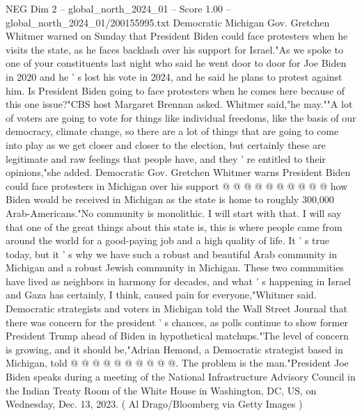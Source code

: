 \begin{textsample}{NEG Dim 2 – global\_north\_2024\_01 – Score 1.00 – global\_north\_2024\_01/200155995.txt}  \label{ex:f2_neg_246}
Democratic Michigan Gov.
Gretchen Whitmer warned on Sunday that President Biden could face protesters when he visits the state, as he faces backlash over his support for Israel."As we spoke to one of your constituents last night who said he went door to door for Joe Biden in 2020 and he ' s lost his vote in 2024, and he said he plans to protest against him.
Is President Biden going to face protesters when he comes here because of this one issue?"CBS host Margaret Brennan asked.
Whitmer said,"he may.""A lot of voters are going to vote for things like individual freedoms, like the basis of our democracy, climate change, so there are a lot of things that are going to come into play as we get closer and closer to the election, but certainly these are legitimate and raw feelings that people have, and they ' re entitled to their opinions,"she added.
Democratic Gov.
Gretchen Whitmer warns President Biden could face protesters in Michigan over his support @ @ @ @ @ @ @ @ @ @ how Biden would be received in Michigan as the state is home to roughly 300,000 Arab-Americans."No community is monolithic.
I will start with that.
I will say that one of the great things about this state is, this is where people came from around the world for a good-paying job and a high quality of life.
It ' s true today, but it ' s why we have such a robust and beautiful Arab community in Michigan and a robust Jewish community in Michigan.
These two communities have lived as neighbors in harmony for decades, and what ' s happening in Israel and Gaza has certainly, I think, caused pain for everyone,"Whitmer said.
Democratic strategists and voters in Michigan told the Wall Street Journal that there was concern for the president ' s chances, as polls continue to show former President Trump ahead of Biden in hypothetical matchups."The level of concern is growing, and it should be,"Adrian Hemond, a Democratic strategist based in Michigan, told @ @ @ @ @ @ @ @ @ @.
The problem is the man."President Joe Biden speaks during a meeting of the National Infrastructure Advisory Council in the Indian Treaty Room of the White House in Washington, DC, US, on Wednesday, Dec. 13, 2023. ( Al Drago/Bloomberg via Getty Images )

\end{textsample}
